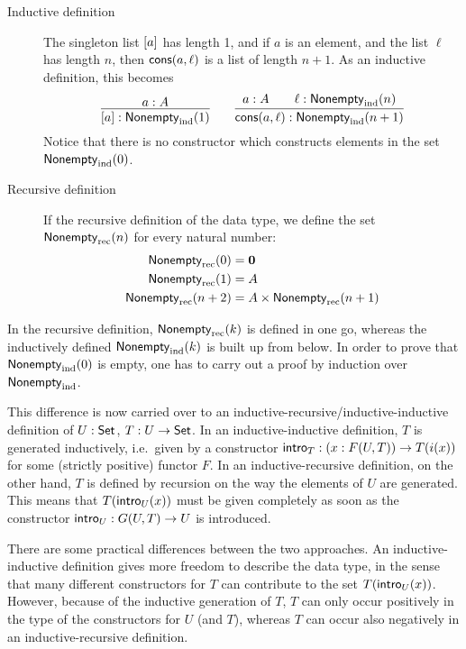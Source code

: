 \documentclass{article}
\begin{document}
\begin{description}
\item[Inductive definition] The singleton list $[a]$ has length 1, and if $a$ is
  an element, and the list $\ell$ has length $n$, then
  $\mathsf{cons}(a, \ell)$ is a list of length $n + 1$. As an inductive
  definition, this becomes
\[
\infer{\singleVec{a} : \Vecind(1)}{a : A} \qquad \infer{\consVec{a}{\ell} :
  \Vecind(n + 1)}{a : A & \quad \ell : \Vecind(n)}
\]
Notice that there is no constructor which constructs elements in the
set $\mathsf{Nonempty}_{\text{ind}}(0)$.

\item[Recursive definition] If the recursive definition of the data
  type, we define the set $\mathsf{Nonempty}_{\text{rec}}(n)$ for every natural number:
  \begin{align*}
    \mathsf{Nonempty}_{\text{rec}}(0) &= \mathbf{0} \\
    \mathsf{Nonempty}_{\text{rec}}(1) &= A \\
    \mathsf{Nonempty}_{\text{rec}}(n + 2) &= A \times \mathsf{Nonempty}_{\text{rec}}(n + 1)
  \end{align*}

\end{description}

In the recursive definition, $\mathsf{Nonempty}_{\text{rec}}(k)$ is defined in one go,
whereas the inductively defined $\mathsf{Nonempty}_{\text{ind}}(k)$ is built up from
below. In order to prove that $\mathsf{Nonempty}_{\text{ind}}(0)$ is empty, one has to carry
out a proof by induction over $\mathsf{Nonempty}_{\text{ind}}$.

This difference is now carried over to an
inductive-recursive/inductive-inductive definition of $U : \mathsf{Set}$, $T :
U \to \mathsf{Set}$.
In an inductive-inductive definition, $T$ is generated
inductively, i.e.\ given by a constructor $\mathsf{intro}_{T} : (x : F(U, T))
\to T(i(x))$ for some (strictly positive) functor
$F$. %
In an inductive-recursive definition, on the other hand, $T$ is
defined by recursion on the way the elements of $U$ are
generated. This means that $T(\mathsf{intro}_{U}(x))$ must be given completely
as soon as the constructor $\mathsf{intro}_{U} : G(U, T) \to U$ is introduced.


There are some practical differences between the two approaches. An
inductive-inductive definition gives more freedom to describe the data
type, in the sense that many different constructors for $T$ can
contribute to the set $T(\mathsf{intro}_{U}(x))$.  However, because of the
inductive generation of $T$, $T$ can only occur positively in the type
of the constructors for $U$ (and $T$), whereas $T$ can occur also
negatively in an inductive-recursive definition.
\end{document}
